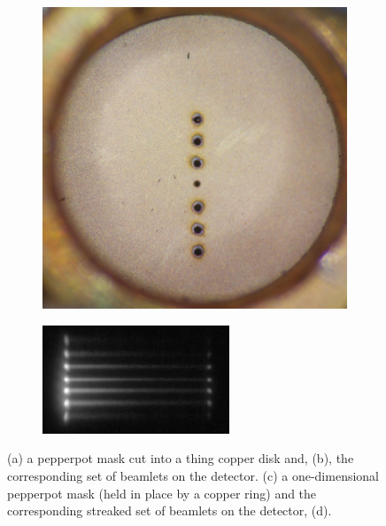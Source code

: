 \begin{figure}
    \begin{subfigure}{0.49\linewidth}
    \centering
    \includegraphics[width=\linewidth]{part2/Figs/example_pepperpot_1d.jpg}
    \caption{}
    \label{figure:1d_pepperpot}
    \end{subfigure}
    \begin{subfigure}{0.49\linewidth}
    \centering
    \includegraphics[width=\linewidth]{part2/Figs/example_streaked_pepperpot.png}
    \caption{}
    \label{figure:streaked_1d_pepperpot}
    \end{subfigure}
    \caption{(a) a pepperpot mask cut into a thing copper disk and, (b), the corresponding set of beamlets on the detector. (c) a one-dimensional pepperpot mask (held in place by a copper ring) and the corresponding streaked set of beamlets on the detector, (d).}
    \label{figure:pepperpot_example}
\end{figure}

